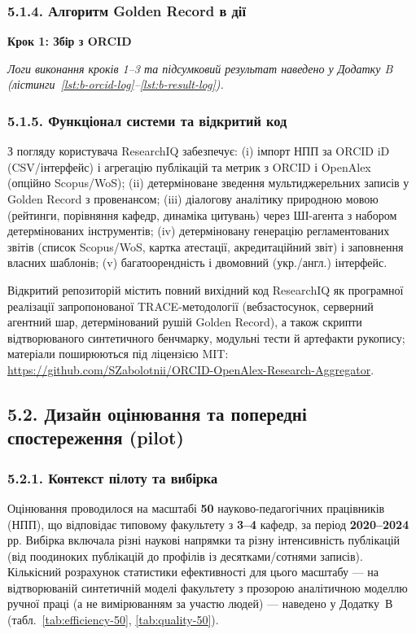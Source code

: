 \subsubsection*{5.1.4. Алгоритм Golden Record в дії}

\textbf{Крок 1: Збір з ORCID}

\textit{Логи виконання кроків 1--3 та підсумковий результат наведено у Додатку B (лістинги~\ref{lst:b-orcid-log}--\ref{lst:b-result-log}).}

\subsubsection*{5.1.5. Функціонал системи та відкритий код}

З погляду користувача ResearchIQ забезпечує: (i) імпорт НПП за ORCID iD (CSV/інтерфейс) і агрегацію публікацій та метрик з ORCID і OpenAlex (опційно Scopus/WoS); (ii) детерміноване зведення мультиджерельних записів у Golden Record з провенансом; (iii) діалогову аналітику природною мовою (рейтинги, порівняння кафедр, динаміка цитувань) через ШІ-агента з набором детермінованих інструментів; (iv) детерміновану генерацію регламентованих звітів (список Scopus/WoS, картка атестації, акредитаційний звіт) і заповнення власних шаблонів; (v) багатоорендність і двомовний (укр./англ.) інтерфейс.

Відкритий репозиторій містить повний вихідний код ResearchIQ як програмної реалізації запропонованої TRACE-методології (вебзастосунок, серверний агентний шар, детермінований рушій Golden Record), а також скрипти відтворюваного синтетичного бенчмарку, модульні тести й артефакти рукопису; матеріали поширюються під ліцензією MIT: \url{https://github.com/SZabolotnii/ORCID-OpenAlex-Research-Aggregator}.

\subsection*{5.2. Дизайн оцінювання та попередні спостереження (pilot)}

\subsubsection*{5.2.1. Контекст пілоту та вибірка}

Оцінювання проводилося на масштабі \textbf{50} науково-педагогічних працівників (НПП), що відповідає типовому факультету з \textbf{3--4} кафедр, за період \textbf{2020--2024} рр. Вибірка включала різні наукові напрямки та різну інтенсивність публікацій (від поодиноких публікацій до профілів із десятками/сотнями записів). Кількісний розрахунок статистики ефективності для цього масштабу --- на відтворюваній синтетичній моделі факультету з прозорою аналітичною моделлю ручної праці (а не вимірюванням за участю людей) --- наведено у Додатку~В (табл.~\ref{tab:efficiency-50}, \ref{tab:quality-50}).

